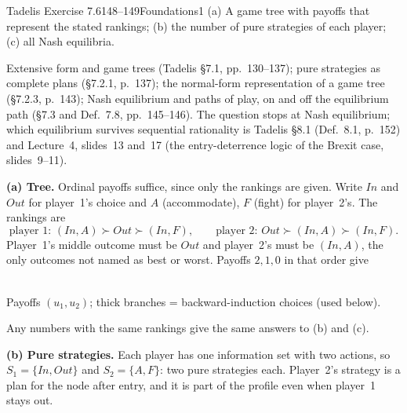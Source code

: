 \begin{exsol}{Tadelis Exercise 7.6}{148--149}{Foundations}{1}
\asked (a) A game tree with payoffs that represent the stated rankings; (b) the number of pure
strategies of each player; (c) all Nash equilibria.

\method Extensive form and game trees (Tadelis \S7.1, pp.~130--137); pure strategies as complete
plans (\S7.2.1, p.~137); the normal-form representation of a game tree (\S7.2.3, p.~143); Nash
equilibrium and paths of play, on and off the equilibrium path (\S7.3 and Def.~7.8, pp.~145--146).
The question stops at Nash equilibrium; which equilibrium survives sequential rationality is
Tadelis \S8.1 (Def.~8.1, p.~152) and Lecture~4, slides~13 and~17 (the entry-deterrence logic of
the Brexit case, slides~9--11).

\solution
\textbf{(a) Tree.} Ordinal payoffs suffice, since only the rankings are given. Write $\mathit{In}$
and $\mathit{Out}$ for player~1's choice and $A$ (accommodate), $F$ (fight) for player~2's. The
rankings are
\[
  \text{player 1: } (\mathit{In},A) \succ \mathit{Out} \succ (\mathit{In},F), \qquad
  \text{player 2: } \mathit{Out} \succ (\mathit{In},A) \succ (\mathit{In},F).
\]
Player~1's middle outcome must be $\mathit{Out}$ and player~2's must be $(\mathit{In},A)$, the only
outcomes not named as best or worst. Payoffs $2,1,0$ in that order give
\begin{center}
\\[2pt]
{\footnotesize Payoffs $(u_1,u_2)$; thick branches = backward-induction choices (used below).}
\end{center}
Any numbers with the same rankings give the same answers to (b) and (c).

\textbf{(b) Pure strategies.} Each player has one information set with two actions, so
$S_1 = \{\mathit{In},\mathit{Out}\}$ and $S_2 = \{A,F\}$: two pure strategies each. Player~2's
strategy is a plan for the node after entry, and it is part of the profile even when player~1
stays out.


\end{exsol}
